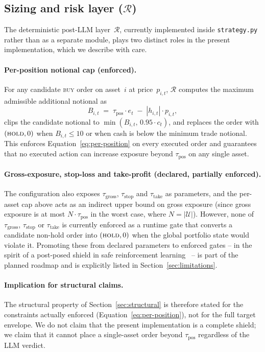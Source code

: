 \documentclass{article}
\begin{document}
\subsection{Sizing and risk layer ($\mathcal{R}$)}
\label{sec:risk}
The deterministic post-LLM layer~$\mathcal{R}$, currently implemented inside \texttt{strategy.py} rather than as a separate module, plays two distinct roles in the present implementation, which we describe with care.

\paragraph{Per-position notional cap (enforced).} For any candidate \textsc{buy} order on asset~$i$ at price~$p_{i,t}$, $\mathcal{R}$ computes the maximum admissible additional notional as
\[
  B_{i,t} \;=\; \tau_{\text{pos}} \cdot e_t \;-\; |h_{i,t}| \cdot p_{i,t},
\]
clips the candidate notional to $\min(B_{i,t},\,0.95 \cdot c_t)$, and replaces the order with $(\textsc{hold},0)$ when $B_{i,t}\leq 10$ or when cash is below the minimum trade notional. This enforces Equation~\eqref{eq:per-position} on every executed order and guarantees that no executed action can increase exposure beyond $\tau_{\text{pos}}$ on any single asset.

\paragraph{Gross-exposure, stop-loss and take-profit (declared, partially enforced).} The configuration also exposes $\tau_{\text{gross}}$, $\tau_{\text{stop}}$ and $\tau_{\text{take}}$ as parameters, and the per-asset cap above acts as an indirect upper bound on gross exposure (since gross exposure is at most $N \cdot \tau_{\text{pos}}$ in the worst case, where $N=|\mathcal{U}|$). However, none of $\tau_{\text{gross}}$, $\tau_{\text{stop}}$ or $\tau_{\text{take}}$ is currently enforced as a runtime gate that converts a candidate non-hold order into $(\textsc{hold},0)$ when the global portfolio state would violate it. Promoting these from declared parameters to enforced gates -- in the spirit of a post-posed shield in safe reinforcement learning~\cite{shielded_rl_alshiekh2018} -- is part of the planned roadmap and is explicitly listed in Section~\ref{sec:limitations}.

\paragraph{Implication for structural claims.} The structural property of Section~\ref{sec:structural} is therefore stated for the constraints actually enforced (Equation~\eqref{eq:per-position}), not for the full target envelope. We do not claim that the present implementation is a complete shield; we claim that it cannot place a single-asset order beyond $\tau_{\text{pos}}$ regardless of the LLM verdict.
\end{document}
